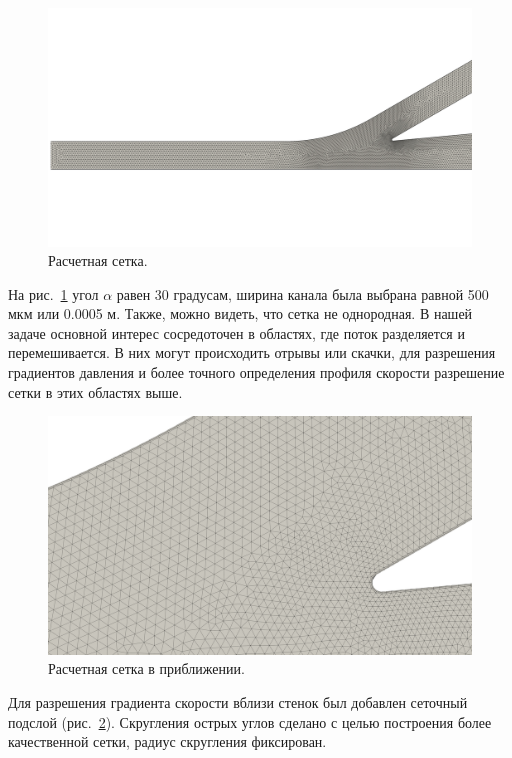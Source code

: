 \documentclass[14pt,a4paper]{article}
\begin{document}
        \begin{figure}[h!]
            \centering
            \includegraphics[width = 1\linewidth]{teslaMesh1}
            \caption{Расчетная сетка.}
            \label{fig:teslaMesh}
        \end{figure}
        
        На рис.~\ref{fig:teslaMesh} угол $\alpha$ равен 30 градусам, ширина канала была выбрана равной 500 мкм или 0.0005 м. Также, можно видеть, что сетка не однородная. В нашей задаче основной интерес сосредоточен в областях, где поток разделяется и перемешивается. В них могут происходить отрывы или скачки, для разрешения градиентов давления и более точного определения профиля скорости разрешение сетки в этих областях выше.
        
        \begin{figure}[H]
            \centering
            \includegraphics[width = 0.7\linewidth]{teslaMesh2}
            \caption{Расчетная сетка в приближении.}
            \label{fig:teslaMesh2}
        \end{figure}   
             
        Для разрешения градиента скорости вблизи стенок был добавлен сеточный подслой (рис.~\ref{fig:teslaMesh2}). Скругления острых углов сделано с целью построения более качественной сетки, радиус скругления фиксирован.
        
\end{document}
